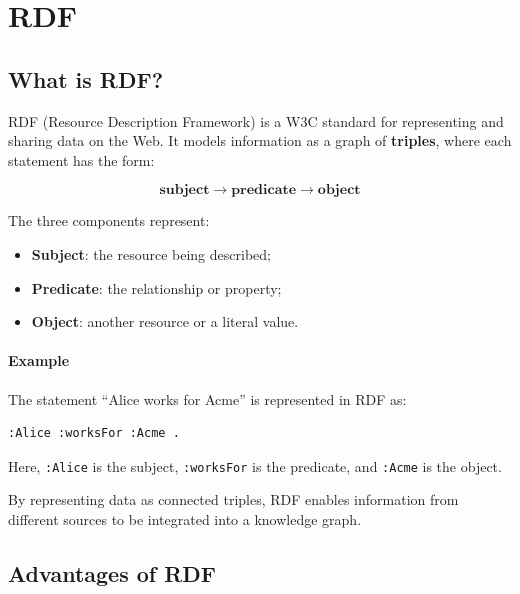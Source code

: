 \section{RDF}

\subsection{What is RDF?}

RDF (Resource Description Framework) is a W3C standard for representing and
sharing data on the Web. It models information as a graph of
\textbf{triples}, where each statement has the form:

\[
  \textbf{subject} \rightarrow \textbf{predicate} \rightarrow \textbf{object}
\]

The three components represent:
\begin{itemize}
  \item \textbf{Subject}: the resource being described;
  \item \textbf{Predicate}: the relationship or property;
  \item \textbf{Object}: another resource or a literal value.
\end{itemize}

\paragraph{Example}

The statement ``Alice works for Acme'' is represented in RDF as:

\begin{verbatim}
:Alice :worksFor :Acme .
\end{verbatim}

Here, \texttt{:Alice} is the subject, \texttt{:worksFor} is the predicate,
and \texttt{:Acme} is the object.

By representing data as connected triples, RDF enables information from
different sources to be integrated into a knowledge graph.

\subsection{Advantages of RDF}

